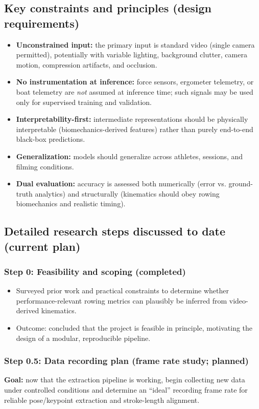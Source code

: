 \documentclass[11pt]{article}
\begin{document}
\subsection*{Key constraints and principles (design requirements)}
\begin{itemize}
	\item \textbf{Unconstrained input:} the primary input is standard video (single camera permitted), potentially with variable lighting, background clutter, camera motion, compression artifacts, and occlusion.
	\item \textbf{No instrumentation at inference:} force sensors, ergometer telemetry, or boat telemetry are \emph{not} assumed at inference time; such signals may be used only for supervised training and validation.
	\item \textbf{Interpretability-first:} intermediate representations should be physically interpretable (biomechanics-derived features) rather than purely end-to-end black-box predictions.
	\item \textbf{Generalization:} models should generalize across athletes, sessions, and filming conditions.
	\item \textbf{Dual evaluation:} accuracy is assessed both numerically (error vs. ground-truth analytics) and structurally (kinematics should obey rowing biomechanics and realistic timing).
\end{itemize}

\subsection*{Detailed research steps discussed to date (current plan)}
\subsubsection*{Step 0: Feasibility and scoping (completed)}
\begin{itemize}
	\item Surveyed prior work and practical constraints to determine whether performance-relevant rowing metrics can plausibly be inferred from video-derived kinematics.
	\item Outcome: concluded that the project is feasible in principle, motivating the design of a modular, reproducible pipeline.
\end{itemize}

\subsubsection*{Step 0.5: Data recording plan (frame rate study; planned)}
\textbf{Goal:} now that the extraction pipeline is working, begin collecting new data under controlled conditions and determine an ``ideal'' recording frame rate for reliable pose/keypoint extraction and stroke-length alignment.
\end{document}
